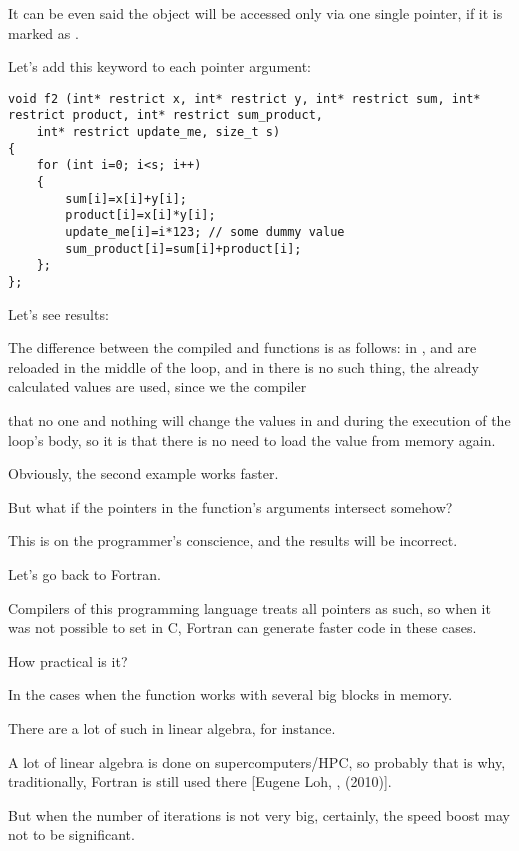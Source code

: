 It can be even said the object will be accessed
only via one single pointer, if it is marked as .

Let's add this keyword to each pointer argument:

\begin{lstlisting}
void f2 (int* restrict x, int* restrict y, int* restrict sum, int* restrict product, int* restrict sum_product, 
	int* restrict update_me, size_t s)
{
	for (int i=0; i<s; i++)
	{
		sum[i]=x[i]+y[i];
		product[i]=x[i]*y[i];
		update_me[i]=i*123; // some dummy value
		sum_product[i]=sum[i]+product[i];	
	};
};
\end{lstlisting}

Let's see results:





The difference between the compiled  and  functions is as follows:
in ,  and  
are reloaded in the middle of the loop,
and in  
there is no such thing,
the already calculated values are used, 
since we  the compiler 

that no one and nothing will change the values in  
and  during the execution of the loop's body, 
so it is  that there is no need to load the value from memory again.

Obviously, the second example works faster.

But what if the pointers in the function's arguments intersect somehow?

This is on the programmer's conscience, and the results will be incorrect.

Let's go back to Fortran. 

Compilers of this programming language treats all pointers as such, 
so when it was not possible to set  in C, Fortran can generate faster code in these cases.

How practical is it? 

In the cases when the function works with several big blocks in memory.

There are a lot of such in linear algebra, for instance.

A lot of linear algebra is done on supercomputers/\ac{HPC}, so probably that is why, traditionally, Fortran is still
used there [Eugene Loh, , (2010)].

But when the number of iterations is not very big,
certainly, the speed boost may not to be significant.
